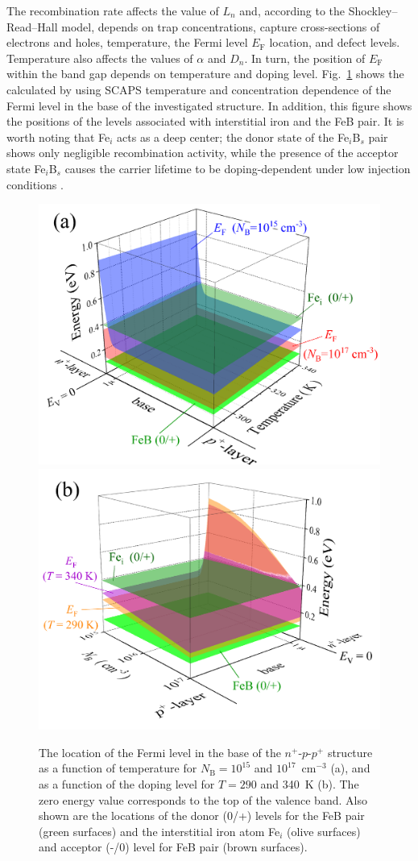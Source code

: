\documentclass[a4paper,fleqn]{cas-sc}
\begin{document}
The recombination rate affects the value of $L_n$ and, according to the Shockley--Read--Hall model,
depends on trap concentrations, capture cross-sections of electrons and holes, temperature, the Fermi level $E_\mathrm{F}$ location, and defect levels.
Temperature also affects the values of $\alpha$ and $D_n$.
In turn, the position of $E_\mathrm{F}$ within the band gap depends on temperature and doping level.
Fig.~\ref{fig4} shows the calculated by using SCAPS temperature and concentration dependence of the Fermi level in the base of the investigated structure.
In addition, this figure shows the positions of the levels associated with interstitial iron and the FeB pair.
It is worth noting that Fe$_i$ acts as a deep center;
the donor state of the Fe$_i$B$_s$ pair shows only negligible recombination activity,
while the presence of the acceptor state Fe$_i$B$_s$ causes the
carrier lifetime to be doping-dependent under low injection conditions \cite{FeB:Schmidt}.

\begin{figure}
	\centering
     \includegraphics[width=0.49\linewidth]{Fig4a.png}
     \includegraphics[width=0.49\linewidth]{Fig4b.png}
	  \caption{The location of the Fermi level in the base of the $n^+$-$p$-$p^+$ structure
       as a function of temperature for $N_\mathrm{B}=10^{15}$ and $10^{17}$~cm$^{-3}$ (a),
       and as a function of the doping level for $T=290$ and 340~K (b).
       The zero energy value corresponds to the top of the valence band.
       Also shown are the locations of the donor (0/+) levels for the FeB pair (green surfaces)
       and the interstitial iron atom Fe$_i$ (olive surfaces) and acceptor (-/0) level for FeB pair (brown surfaces).
}\label{fig4}
\end{figure}
\end{document}
